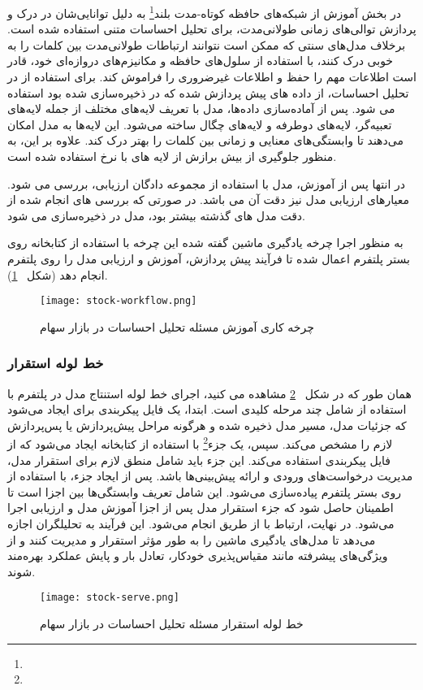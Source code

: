در بخش آموزش از شبکه‌های حافظه کوتاه-مدت بلند\footnote{} به دلیل توانایی‌شان در درک و پردازش توالی‌های زمانی طولانی‌مدت، برای تحلیل احساسات متنی استفاده شده است. برخلاف مدل‌های سنتی که ممکن است نتوانند ارتباطات طولانی‌مدت بین کلمات را به خوبی درک کنند،  با استفاده از سلول‌های حافظه و مکانیزم‌های دروازه‌ای خود، قادر است اطلاعات مهم را حفظ و اطلاعات غیرضروری را فراموش کند. برای استفاده از  در تحلیل احساسات، از داده های پیش پردازش شده که در  ذخیره‌سازی شده بود استفاده می شود. پس از آماده‌سازی داده‌ها، مدل  با تعریف لایه‌های مختلف از جمله لایه‌های تعبیه‌گر، لایه‌های  دوطرفه و لایه‌های چگال ساخته می‌شود. این لایه‌ها به مدل امکان می‌دهند تا وابستگی‌های معنایی و زمانی بین کلمات را بهتر درک کند. علاوه بر این،‌ به منظور جلوگیری از بیش برازش از لایه های  با نرخ  استفاده شده است.

در انتها پس از آموزش، مدل با استفاده از مجموعه دادگان ارزیابی، بررسی می شود. معیارهای ارزیابی مدل نیز دقت آن می باشد. در صورتی که بررسی های انجام شده از دقت مدل های گذشته بیشتر بود، مدل در  ذخیره‌سازی می شود.

به منظور اجرا چرخه یادگیری ماشین گفته شده این چرخه با استفاده از کتابخانه  روی بستر پلتفرم اعمال شده تا فرآیند پیش پردازش،‌ آموزش و ارزیابی مدل را روی پلتفرم انجام دهد (شکل ~\ref{fig: stock workflow}).

\begin{figure}[t]
	\centering
	\texttt{[image: stock-workflow.png]}
	\caption{چرخه کاری آموزش مسئله تحلیل احساسات در بازار سهام}
	\label{fig: stock workflow}
\end{figure}

\subsubsection{خط لوله استقرار}
همان طور که در شکل 
~\ref{fig: stock serve}
مشاهده می کنید، اجرای خط لوله استنتاج مدل در پلتفرم با استفاده از  شامل چند مرحله کلیدی است. ابتدا، یک فایل پیکربندی برای  ایجاد می‌شود که جزئیات مدل، مسیر مدل ذخیره شده و هرگونه مراحل پیش‌پردازش یا پس‌پردازش لازم را مشخص می‌کند. سپس، یک جزء\footnote{}   با استفاده از کتابخانه  ایجاد می‌شود که از فایل پیکربندی  استفاده می‌کند. این جزء باید شامل منطق لازم برای استقرار مدل، مدیریت درخواست‌های ورودی و ارائه پیش‌بینی‌ها باشد. پس از ایجاد جزء، با استفاده از  روی بستر پلتفرم پیاده‌سازی می‌شود. این شامل تعریف وابستگی‌ها بین اجزا است تا اطمینان حاصل شود که جزء استقرار مدل پس از اجزا آموزش مدل و ارزیابی اجرا می‌شود. در نهایت، ارتباط با  از طریق  انجام می‌شود. این فرآیند به تحلیلگران اجازه می‌دهد تا مدل‌های یادگیری ماشین را به طور مؤثر استقرار و مدیریت کنند و از ویژگی‌های پیشرفته مانند مقیاس‌پذیری خودکار، تعادل بار و پایش عملکرد بهره‌مند شوند. 
\begin{figure}[!t]
	\centering
	\texttt{[image: stock-serve.png]}
	\caption{خط لوله استقرار مسئله تحلیل احساسات در بازار سهام}
	\label{fig: stock serve}
\end{figure}


